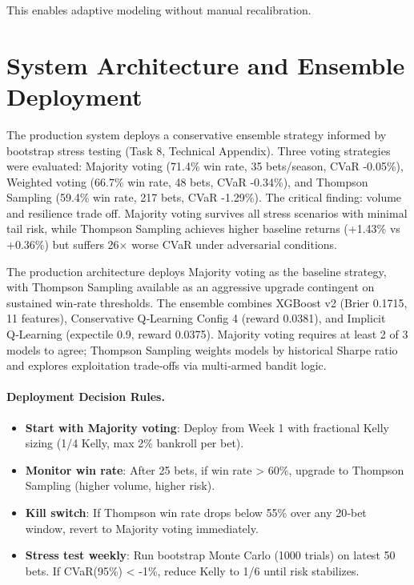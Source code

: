 This enables adaptive modeling without manual recalibration.

\section{System Architecture and Ensemble Deployment}
\label{sec:system_architecture}

The production system deploys a conservative ensemble strategy informed by bootstrap stress testing (Task 8, Technical Appendix). Three voting strategies were evaluated: Majority voting (71.4\% win rate, 35 bets/season, CVaR -0.05\%), Weighted voting (66.7\% win rate, 48 bets, CVaR -0.34\%), and Thompson Sampling (59.4\% win rate, 217 bets, CVaR -1.29\%). The critical finding: volume and resilience trade off. Majority voting survives all stress scenarios with minimal tail risk, while Thompson Sampling achieves higher baseline returns (+1.43\% vs +0.36\%) but suffers 26× worse CVaR under adversarial conditions.

The production architecture deploys Majority voting as the baseline strategy, with Thompson Sampling available as an aggressive upgrade contingent on sustained win‑rate thresholds. The ensemble combines XGBoost v2 (Brier 0.1715, 11 features), Conservative Q‑Learning Config 4 (reward 0.0381), and Implicit Q‑Learning (expectile 0.9, reward 0.0375). Majority voting requires at least 2 of 3 models to agree; Thompson Sampling weights models by historical Sharpe ratio and explores exploitation trade‑offs via multi‑armed bandit logic.

\paragraph{Deployment Decision Rules.}
\begin{itemize}
\item \textbf{Start with Majority voting}: Deploy from Week 1 with fractional Kelly sizing (1/4 Kelly, max 2\% bankroll per bet).
\item \textbf{Monitor win rate}: After 25 bets, if win rate > 60\%, upgrade to Thompson Sampling (higher volume, higher risk).
\item \textbf{Kill switch}: If Thompson win rate drops below 55\% over any 20‑bet window, revert to Majority voting immediately.
\item \textbf{Stress test weekly}: Run bootstrap Monte Carlo (1000 trials) on latest 50 bets. If CVaR(95\%) < -1\%, reduce Kelly to 1/6 until risk stabilizes.
\end{itemize}

